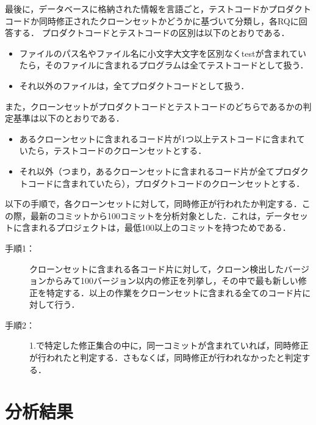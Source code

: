 \documentclass[T,J]{fose}
\begin{document}
最後に，データベースに格納された情報を言語ごと，テストコードかプロダクトコードか同時修正されたクローンセットかどうかに基づいて分類し，各RQに回答する．
プロダクトコードとテストコードの区別は以下のとおりである．
\begin{itemize}
    \item ファイルのパス名やファイル名に小文字大文字を区別なく{\sf test}が含まれていたら，そのファイルに含まれるプログラムは全てテストコードとして扱う．
    \item それ以外のファイルは，全てプロダクトコードとして扱う．
\end{itemize}
また，クローンセットがプロダクトコードとテストコードのどちらであるかの判定基準は以下のとおりである．
\begin{itemize}
\item あるクローンセットに含まれるコード片が1つ以上テストコードに含まれていたら，テストコードのクローンセットとする．
\item それ以外（つまり，あるクローンセットに含まれるコード片が全てプロダクトコードに含まれていたら），プロダクトコードのクローンセットとする．
\end{itemize}
以下の手順で，各クローンセットに対して，同時修正が行われたか判定する．この際，最新のコミットから100コミットを分析対象とした．これは，データセット\cite{amoroso2024dataset}に含まれるプロジェクトは，最低100以上のコミットを持つためである．
\begin{description}
    \item[手順1：] クローンセットに含まれる各コード片に対して，クローン検出したバージョンからみて100バージョン以内の修正を列挙し，その中で最も新しい修正を特定する．以上の作業をクローンセットに含まれる全てのコード片に対して行う．
    \item[手順2：] 1.で特定した修正集合の中に，同一コミットが含まれていれば，同時修正が行われたと判定する．さもなくば，同時修正が行われなかったと判定する．
\end{description}


\section{分析結果}
\end{document}
